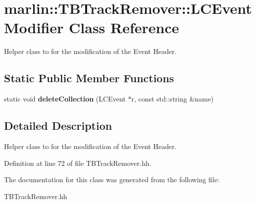 \section{marlin::TBTrackRemover::LCEventModifier Class Reference}
\label{classmarlin_1_1TBTrackRemover_1_1LCEventModifier}


Helper class to for the modification of the Event Header.  
\subsection*{Static Public Member Functions}
\begin{DoxyCompactItemize}
\item 
static void {\bfseries deleteCollection} (LCEvent $\ast$r, const std::string \&name)\label{classmarlin_1_1TBTrackRemover_1_1LCEventModifier_adac30a804a963f47f0da9dff12be6a12}

\end{DoxyCompactItemize}


\subsection{Detailed Description}
Helper class to for the modification of the Event Header. 

Definition at line 72 of file TBTrackRemover.hh.

The documentation for this class was generated from the following file:\begin{DoxyCompactItemize}
\item 
TBTrackRemover.hh\end{DoxyCompactItemize}
